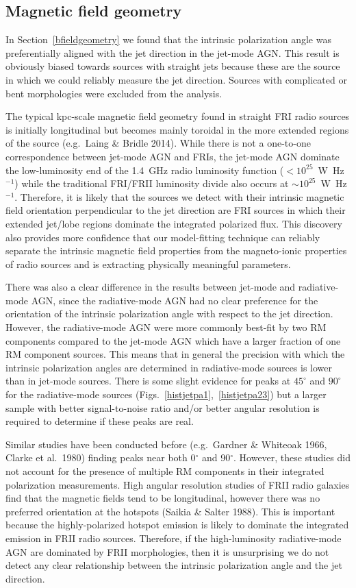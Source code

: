 \documentclass{mnras}
\begin{document}
\subsection{Magnetic field geometry}
In Section~\ref{bfieldgeometry} we found that the intrinsic polarization angle was preferentially aligned with the jet direction in the jet-mode AGN. This result is obviously biased towards sources with straight jets because these are the source in which we could reliably measure the jet direction. Sources with complicated or bent morphologies were excluded from the analysis.  

The typical kpc-scale magnetic field geometry found in straight FRI radio sources is initially longitudinal but becomes mainly toroidal in the more extended regions of the source (e.g.~Laing \& Bridle 2014). While there is not a one-to-one correspondence between jet-mode AGN and FRIs, the jet-mode AGN dominate the low-luminosity end of the 1.4~GHz radio luminosity function ($<10^{25}$~W~Hz$^{-1}$) while the traditional FRI/FRII luminosity divide also occurs at $\sim10^{25}$~W~Hz$^{-1}$. Therefore, it is likely that the sources we detect with their intrinsic magnetic field orientation perpendicular to the jet direction are FRI sources in which their extended jet/lobe regions dominate the integrated polarized flux. 
This discovery also provides more confidence that our model-fitting technique can reliably separate the intrinsic magnetic field properties from the magneto-ionic properties of radio sources and is extracting physically meaningful parameters. 

There was also a clear difference in the results between jet-mode and radiative-mode AGN, since the radiative-mode AGN had no clear preference for the orientation of the intrinsic polarization angle with respect to the jet direction. However, the radiative-mode AGN were more commonly best-fit by two RM components compared to the jet-mode AGN which have a larger fraction of one RM component sources. This means that in general the precision with which the intrinsic polarization angles are determined in radiative-mode sources is lower than in jet-mode sources. There is some slight evidence for peaks at $45^\circ$ and $90^\circ$ for the radiative-mode sources (Figs.~\ref{histjetpa1},~\ref{histjetpa23}) but a larger sample with better signal-to-noise ratio and/or better angular resolution is required to determine if these peaks are real. 

Similar studies have been conducted before (e.g.~Gardner \& Whiteoak 1966, Clarke et al.~1980) finding peaks near both 0$^\circ$ and 90$^\circ$. However, these studies did not account for the presence of multiple RM components in their integrated polarization measurements. 
High angular resolution studies of FRII radio galaxies find that the magnetic fields tend to be longitudinal, however there was no preferred orientation at the hotspots (Saikia \& Salter 1988). This is important because the highly-polarized hotspot emission is likely to dominate the integrated emission in FRII radio sources. Therefore, if the high-luminosity radiative-mode AGN are dominated by FRII morphologies, then it is unsurprising we do not detect any clear relationship between the intrinsic polarization angle and the jet direction.  
\end{document}
